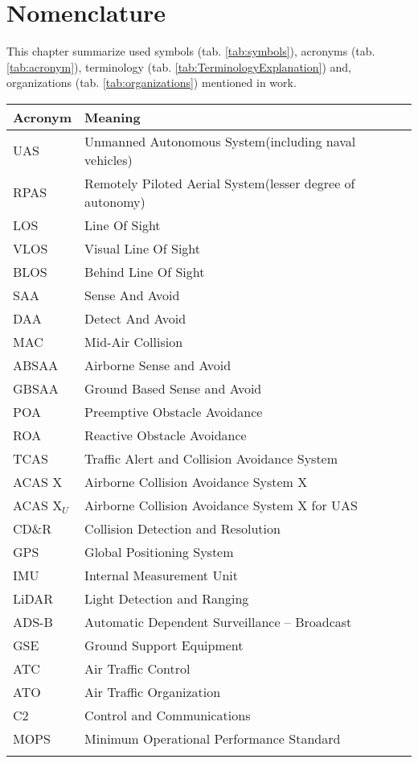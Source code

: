 \section*{Nomenclature}
\noindent
This chapter summarize used symbols (tab. \ref{tab:symbols}), acronyms (tab. \ref{tab:acronym}), terminology (tab. \ref{tab:TerminologyExplanation}) and, organizations (tab. \ref{tab:organizations}) mentioned in work. 

\begin{tabularx}{\textwidth}{l|X} 
    Acronym & Meaning\\ \hline\hline
    UAS & Unmanned Autonomous System(including naval vehicles)\\ 
    RPAS & Remotely Piloted Aerial System(lesser degree of autonomy)\\\hline
    LOS & Line Of Sight\\ 
    VLOS & Visual Line Of Sight\\ 
    BLOS & Behind Line Of Sight\\ \hline
    SAA & Sense And Avoid\\ 
    DAA & Detect And Avoid \\ 
    MAC & Mid-Air Collision \\
    ABSAA & Airborne Sense and Avoid\\
    GBSAA & Ground Based Sense and Avoid\\
    POA & Preemptive Obstacle Avoidance\\
    ROA & Reactive Obstacle Avoidance \\\hline
    TCAS &Traffic Alert and Collision Avoidance System\\
    ACAS X & Airborne Collision Avoidance System X\\
    ACAS X$_U$ & Airborne Collision Avoidance System X for UAS\\
    CD\&R & Collision Detection and Resolution\\ \hline 
    GPS & Global Positioning System\\ 
    IMU & Internal Measurement Unit\\ 
    LiDAR &  Light Detection and Ranging \\ 
    ADS-B & Automatic Dependent Surveillance – Broadcast\\ 
    GSE & Ground Support Equipment\\\hline
    ATC & Air Traffic Control \\
    ATO & Air Traffic Organization\\
    C2 & Control and Communications\\\hline
    MOPS & Minimum Operational Performance Standard\\
    \caption{List of Acronyms}
    \label{tab:acronym}
\end{tabularx}

